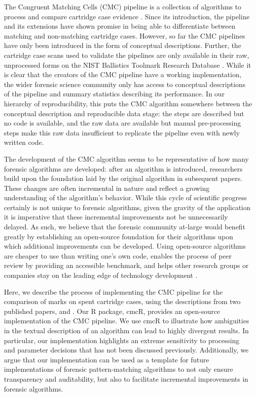 \documentclass[11pt,]{isuthesis}
\begin{document}
The Congruent Matching Cells (CMC) pipeline is a collection of algorithms to process and compare cartridge case evidence \citep{song_proposed_2013}.
Since its introduction, the pipeline and its extensions \citep{tong_improved_2015, chen_convergence_2017, song_estimating_2018} have shown promise in being able to differentiate between matching and non-matching cartridge cases.
However, so far the CMC pipelines have only been introduced in the form of conceptual descriptions.
Further, the cartridge case scans used to validate the pipelines are only available in their raw, unprocessed forms on the NIST Ballistics Toolmark Research Database \citep{nbtrd}.
While it is clear that the creators of the CMC pipeline have a working implementation, the wider forensic science community only has access to conceptual descriptions of the pipeline and summary statistics describing its performance.
In our hierarchy of reproducibility, this puts the CMC algorithm somewhere between the conceptual description and reproducible data stage: the steps are described but no code is available, and the raw data are available but manual pre-processing steps make this raw data insufficient to replicate the pipeline even with newly written code.

The development of the CMC algorithm seems to be representative of how many forensic algorithms are developed: after an algorithm is introduced, researchers build upon the foundation laid by the original algorithm in subsequent papers.
These changes are often incremental in nature and reflect a growing understanding of the algorithm's behavior.
While this cycle of scientific progress certainly is not unique to forensic algorithms, given the gravity of the application it is imperative that these incremental improvements not be unnecessarily delayed.
As such, we believe that the forensic community at-large would benefit greatly by establishing an open-source foundation for their algorithms upon which additional improvements can be developed.
Using open-source algorithms are cheaper to use than writing one's own code, enables the process of peer review by providing an accessible benchmark, and helps other research groups or companies stay on the leading edge of technology development \citep{linux}.

Here, we describe the process of implementing the CMC pipeline for the comparison of marks on spent cartridge cases, using the descriptions from two published papers, \citet{song_3d_2014} and \citet{tong_improved_2015}.
Our R package, cmcR, provides an open-source implementation of the CMC pipeline.
We use cmcR to illustrate how ambiguities in the textual description of an algorithm can lead to highly divergent results.
In particular, our implementation highlights an extreme sensitivity to processing and parameter decisions that has not been discussed previously.
Additionally, we argue that our implementation can be used as a template for future implementations of forensic pattern-matching algorithms to not only ensure transparency and auditability, but also to facilitate incremental improvements in forensic algorithms.
\end{document}
